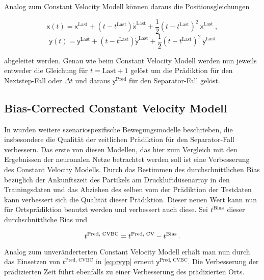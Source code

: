 Analog zum Constant Velocity Modell können daraus die Positionsgleichungen 

\begin{equation*}
    \mathsf{x}(t) = \mathsf{x}^{\text{Last}} + (t - t^{\text{Last}})\dot{\mathsf{x}}^{\text{Last}} 
    + \frac{1}{2} (t - t^{\text{Last}})^2 \: \ddot{\mathsf{x}}^{\text{Last}} \: , 
\end{equation*}
\begin{equation*}
    \mathsf{y}(t) = \mathsf{y}^{\text{Last}} + (t - t^{\text{Last}})\dot{\mathsf{y}}^{\text{Last}}
    + \frac{1}{2} (t - t^{\text{Last}})^2 \: \ddot{\mathsf{y}}^{\text{Last}}
\end{equation*}

abgeleitet werden.
Genau wie beim Constant Velocity Modell werden nun jeweils entweder die Gleichung für \(t = \text{Last} + 1\) gelöst 
um die Prädiktion für den Nextstep-Fall oder \(\Delta t \) und daraus \(\mathsf{y}^{\text{Pred}}\) für den Separator-Fall gelöst.


\subsection{Bias-Corrected Constant Velocity Modell}

In \cite{Pfaff2018} wurden weitere szenariospezifische Bewegungsmodelle beschrieben, die insbesondere die Qualität der zeitlichen Prädiktion für den Separator-Fall verbessern.
Das erste von diesen Modellen, das hier zum Vergleich mit den Ergebnissen der neuronalen Netze betrachtet werden soll ist eine Verbesserung des Constant Velocity Modells.
Durch das Bestimmen des durchschnittlichen Bias bezüglich der Ankunftszeit des Partikels am Druckluftdüsenarray in den Trainingsdaten und das Abziehen des selben vom der Prädiktion der Testdaten kann verbessert sich die Qualität dieser Prädiktion.
Dieser neuen Wert kann nun für Ortsprädiktion benutzt werden und verbessert auch diese.
Sei \(t{^{\text{Bias}}}\) dieser durchschnittliche Bias und

\begin{equation*}
    t{^{\text{Pred, CVBC}}} = t{^{\text{Pred, CV}}} - t{^{\text{Bias}}} \, .
\end{equation*}

Analog zum unveränderterten Constant Velocity Modell erhält man nun durch das Einsetzen von \(t^{\text{Pred, CVBC}}\) in \eqref{eq:cvyp} erneut \(\mathsf{y}^{\text{Pred, CVBC}}\).
Die Verbesserung der prädizierten Zeit führt ebenfalls zu einer Verbesserung des prädizierten Orts.


